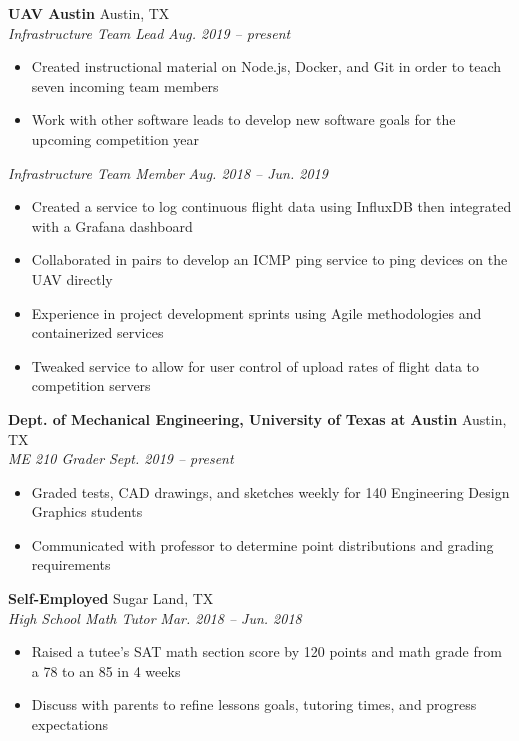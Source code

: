 \documentclass[letterpaper,11pt]{article}
\begin{document}
\textbf{UAV Austin} \hfill Austin, TX\\
\textit{Infrastructure Team Lead} \hfill \textit{Aug. 2019 -- present}\\
\begin{itemize}[noitemsep, topsep=0pt, leftmargin=0.7cm]
  \item Created instructional material on Node.js, Docker, and Git in order to teach seven incoming team members
  \item Work with other software leads to develop new software goals for the upcoming competition year
\end{itemize}
\textit{Infrastructure Team Member} \hfill \textit{Aug. 2018 -- Jun. 2019}\\
\begin{itemize}[noitemsep, topsep=0pt, leftmargin=0.7cm]
  \item Created a service to log continuous flight data using InfluxDB then integrated with a Grafana dashboard
  \item Collaborated in pairs to develop an ICMP ping service to ping devices on the UAV directly
  \item Experience in project development sprints using Agile methodologies and containerized services 
  \item Tweaked service to allow for user control of upload rates of flight data to competition servers %
\end{itemize}

\textbf{Dept. of Mechanical Engineering, University of Texas at Austin} \hfill Austin, TX\\
\textit{ME 210 Grader} \hfill \textit{Sept. 2019 -- present}\\
\begin{itemize}[noitemsep, topsep=0pt, leftmargin=0.7cm]
  \item Graded tests, CAD drawings, and sketches weekly for 140 Engineering Design Graphics students
  \item Communicated with professor to determine point distributions and grading requirements
\end{itemize}

\textbf{Self-Employed} \hfill Sugar Land, TX\\
\textit{High School Math Tutor} \hfill \textit{Mar. 2018 -- Jun. 2018}\\
\begin{itemize}[noitemsep, topsep=0pt, leftmargin=0.7cm]
  \item Raised a tutee’s SAT math section score by 120 points and math grade from a 78 to an 85 in 4 weeks
  \item Discuss with parents to refine lessons goals, tutoring times, and progress expectations
\end{itemize}
\end{document}
